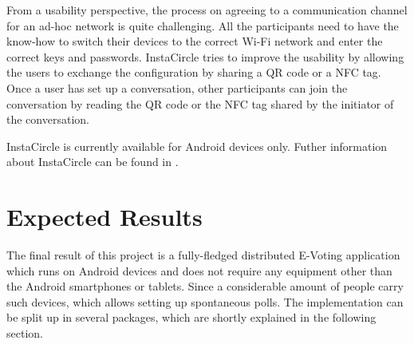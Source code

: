 \documentclass[numbers=noenddot, abstract=on]{scrreprt}
\begin{document}
From a usability perspective, the process on agreeing to a communication channel
for an ad-hoc network is quite challenging. All the participants need to have
the know-how to switch their devices to the correct Wi-Fi network and enter the
correct keys and passwords. InstaCircle tries to improve the usability by
allowing the users to exchange the configuration by sharing a QR code or a NFC
tag. Once a user has set up a conversation, other participants can join the
conversation by reading the QR code or the NFC tag shared by the initiator of
the conversation.

InstaCircle is currently available for Android devices only. Futher information
about InstaCircle can be found in \cite{ritter13a}.

\chapter{Expected Results}
\label{cha:expectedresults}
The final result of this project is a fully-fledged distributed E-Voting
application which runs on Android devices and does not require any equipment
other than the Android smartphones or tablets. Since a considerable amount of
people carry such devices, which allows setting up spontaneous polls. The
implementation can be split up in several packages, which are shortly explained
in the following section.
\end{document}
